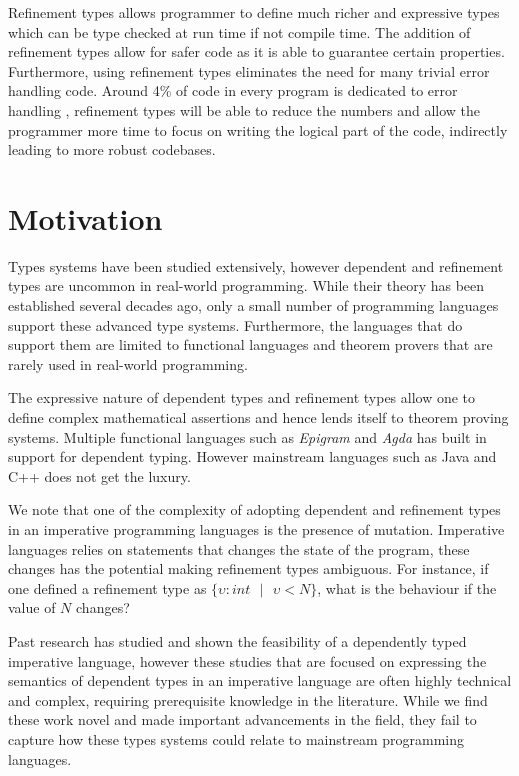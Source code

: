 \documentclass[a4paper,12pt]{report}
\begin{document}
\par
Refinement types allows programmer to define much richer and expressive types 
which can be type checked at run time if not compile time. The addition 
of refinement types allow for safer code as it is able to guarantee certain 
properties. Furthermore, using refinement types eliminates the need for many 
trivial error handling code. Around 4\% of code in every program is 
dedicated to error handling \cite{errorHandlingCode}, refinement types will be 
able to reduce the numbers and allow the programmer more time to 
focus on writing the logical part of the code, indirectly 
leading to more robust codebases.

\section{Motivation}
Types systems have been studied extensively, however dependent and refinement types 
are uncommon in real-world programming. While their theory has been 
established several decades ago, only a small number of programming languages 
support these advanced type systems. Furthermore, the languages that do support 
them are limited to functional languages and theorem provers that are rarely 
used in real-world programming.


\par
The expressive nature of dependent types and refinement types allow one to 
define complex mathematical assertions and hence lends itself to 
theorem proving systems. Multiple functional languages such as \textit{Epigram} 
\cite{epigram} and \textit{Agda} \cite{agda} has 
built in support for dependent typing. However 
mainstream languages such as Java and C++ does not get the luxury.

\par
We note that one of the complexity of adopting dependent and refinement types 
in an imperative programming languages is the presence of mutation. Imperative 
languages relies on statements that changes the state of the program, these 
changes has the potential making refinement types ambiguous. For instance, if 
one defined a refinement type as $\{\upsilon : int\text{ }|\text{ }\upsilon < N\}$, 
what is the behaviour if the value of $N$ changes?

\par
Past research has studied and shown the feasibility of a dependently typed 
imperative language, however these studies that are focused on expressing 
the semantics of dependent types in an imperative language are often highly 
technical and complex, requiring prerequisite knowledge in the literature. While 
we find these work novel and made important advancements in the field, 
they fail to capture how these types systems could relate to 
mainstream programming languages.
\end{document}
